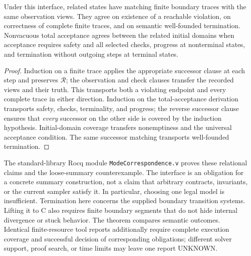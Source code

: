 \begin{theorem}
\label{thm:mode-correspondence}
Under this interface, related states have matching finite boundary traces
with the same observation views. They agree on existence of a reachable
violation, on correctness of complete finite traces, and on semantic
well-founded termination. Nonvacuous total acceptance agrees between the
related initial domains when acceptance requires safety and all selected
checks, progress at nonterminal states, and termination without outgoing
steps at terminal states.
\end{theorem}
\begin{proof}
Induction on a finite trace applies the appropriate successor clause at
each step and preserves $\mathcal R$; the observation and check clauses
transfer the recorded views and their truth. This transports both a
violating endpoint and every complete trace in either direction.
Induction on the total-acceptance derivation transports safety, checks,
terminality, and progress; the reverse successor clause ensures that
\emph{every} successor on the other side is covered by the induction
hypothesis. Initial-domain coverage transfers nonemptiness and the
universal acceptance condition. The same successor matching transports
well-founded termination.
\end{proof}

The standard-library Rocq module \texttt{ModeCorrespondence.v} proves
these relational claims and the loose-summary counterexample.
The interface is an obligation for a concrete summary construction,
not a claim that arbitrary contracts, invariants, or the current sampler
satisfy it. In particular, choosing one legal model is insufficient.
Termination here concerns the supplied boundary transition systems.
Lifting it to C also requires finite boundary segments that do not hide
internal divergence or stuck behavior. The theorem compares semantic outcomes. Identical finite-resource tool
reports additionally require complete execution coverage and successful
decision of corresponding obligations; different solver support, proof
search, or time limits may leave one report UNKNOWN.
